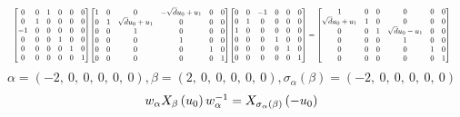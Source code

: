 \documentclass[11pt]{article}
\theoremstyle{definition}
\begin{document}
\[
\scaletoalign{\textwidth}{{\left[\begin{matrix}0 & 0 & 1 & 0 & 0 & 0\\0 & 1 & 0 & 0 & 0 & 0\\-1 & 0 & 0 & 0 & 0 & 0\\0 & 0 & 0 & 1 & 0 & 0\\0 & 0 & 0 & 0 & 1 & 0\\0 & 0 & 0 & 0 & 0 & 1\end{matrix}\right]} {\left[\begin{matrix}1 & 0 & 0 & - \sqrt{d} u_{0} + u_{1} & 0 & 0\\0 & 1 & \sqrt{d} u_{0} + u_{1} & 0 & 0 & 0\\0 & 0 & 1 & 0 & 0 & 0\\0 & 0 & 0 & 1 & 0 & 0\\0 & 0 & 0 & 0 & 1 & 0\\0 & 0 & 0 & 0 & 0 & 1\end{matrix}\right]} {\left[\begin{matrix}0 & 0 & -1 & 0 & 0 & 0\\0 & 1 & 0 & 0 & 0 & 0\\1 & 0 & 0 & 0 & 0 & 0\\0 & 0 & 0 & 1 & 0 & 0\\0 & 0 & 0 & 0 & 1 & 0\\0 & 0 & 0 & 0 & 0 & 1\end{matrix}\right]} = {\left[\begin{matrix}1 & 0 & 0 & 0 & 0 & 0\\\sqrt{d} u_{0} + u_{1} & 1 & 0 & 0 & 0 & 0\\0 & 0 & 1 & \sqrt{d} u_{0} - u_{1} & 0 & 0\\0 & 0 & 0 & 1 & 0 & 0\\0 & 0 & 0 & 0 & 1 & 0\\0 & 0 & 0 & 0 & 0 & 1\end{matrix}\right]}}
\]
\[
\alpha = \left( -2, \  0, \  0, \  0, \  0, \  0\right), \beta = \left( 2, \  0, \  0, \  0, \  0, \  0\right), \sigma_{\alpha}(\beta) = \left( -2, \  0, \  0, \  0, \  0, \  0\right)
\]
\[
\scaletoalign{\textwidth}{w_{\alpha} X_{\beta}\left(u_{0}\right) w_{\alpha}^{-1} = X_{\sigma_{\alpha}\left(\beta\right)}\left(- u_{0}\right)}
\]
\end{document}

